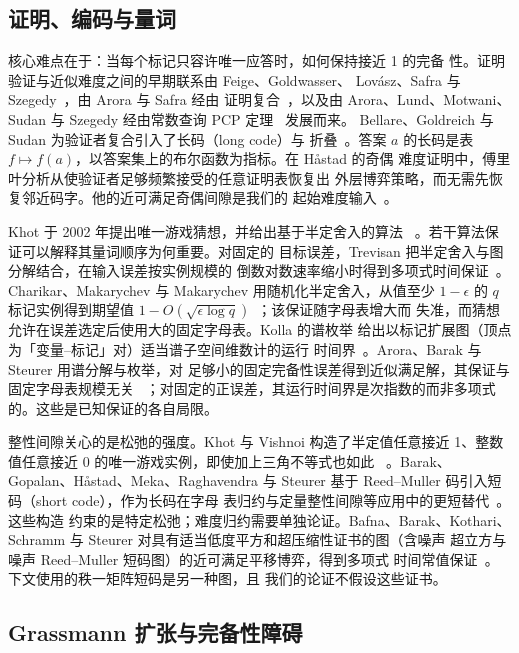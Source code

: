 \subsection{证明、编码与量词}

核心难点在于：当每个标记只容许唯一应答时，如何保持接近 1 的完备
性。证明验证与近似难度之间的早期联系由 Feige、Goldwasser、
Lov\'asz、Safra 与 Szegedy~\cite{FGLSS96}，由 Arora 与 Safra 经由
证明复合~\cite{AroraSafra98}，以及由 Arora、Lund、Motwani、Sudan
与 Szegedy 经由常数查询 PCP 定理~\cite{ALMSS98} 发展而来。
Bellare、Goldreich 与 Sudan 为验证者复合引入了长码（long code）与
折叠~\cite[Section~3.3]{BGS98}。答案 \(a\) 的长码是表
\(f\mapsto f(a)\)，以答案集上的布尔函数为指标。在 H\aa stad 的奇偶
难度证明中，傅里叶分析从使验证者足够频繁接受的任意证明表恢复出
外层博弈策略，而无需先恢复邻近码字。他的近可满足奇偶间隙是我们的
起始难度输入~\cite{Hastad01}。

Khot 于 2002 年提出唯一游戏猜想，并给出基于半定舍入的算法
~\cite{Khot02}。若干算法保证可以解释其量词顺序为何重要。对固定的
目标误差，Trevisan 把半定舍入与图分解结合，在输入误差按实例规模的
倒数对数速率缩小时得到多项式时间保证~\cite{Trevisan08}。
Charikar、Makarychev 与 Makarychev 用随机化半定舍入，从值至少
\(1-\epsilon\) 的 \(q\) 标记实例得到期望值
\(1-O(\sqrt{\epsilon\log q})\)~\cite{CMM06}；该保证随字母表增大而
失准，而猜想允许在误差选定后使用大的固定字母表。Kolla 的谱枚举
给出以标记扩展图（顶点为「变量–标记」对）适当谱子空间维数计的运行
时间界~\cite{Kolla11}。Arora、Barak 与 Steurer 用谱分解与枚举，对
足够小的固定完备性误差得到近似满足解，其保证与固定字母表规模无关
~\cite{ABS10}；对固定的正误差，其运行时间界是次指数的而非多项式
的。这些是已知保证的各自局限。

整性间隙关心的是松弛的强度。Khot 与 Vishnoi 构造了半定值任意接近
1、整数值任意接近 0 的唯一游戏实例，即使加上三角不等式也如此
~\cite{KV15}。Barak、Gopalan、H\aa stad、Meka、Raghavendra 与
Steurer 基于 Reed--Muller 码引入短码（short code），作为长码在字母
表归约与定量整性间隙等应用中的更短替代~\cite{BGHMRS15}。这些构造
约束的是特定松弛；难度归约需要单独论证。Bafna、Barak、Kothari、
Schramm 与 Steurer 对具有适当低度平方和超压缩性证书的图（含噪声
超立方与噪声 Reed--Muller 短码图）的近可满足平移博弈，得到多项式
时间常值保证~\cite{BBKSS21}。下文使用的秩一矩阵短码是另一种图，且
我们的论证不假设这些证书。

\subsection{Grassmann 扩张与完备性障碍}

